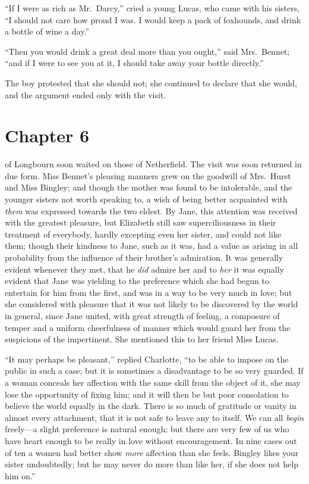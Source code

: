 ``If I were as rich as Mr.\ Darcy,'' cried a young Lucas, who
came with his sisters, ``I should not care how proud I was.  I
would keep a pack of foxhounds, and drink a bottle of wine a
day.''

``Then you would drink a great deal more than you ought,'' said
Mrs.\ Bennet; ``and if I were to see you at it, I should take away
your bottle directly.''

The boy protested that she should not; she continued to declare
that she would, and the argument ended only with the visit.



\chapter{Chapter 6}


 of Longbourn soon waited on those of Netherfield.
The visit was soon returned in due form.  Miss Bennet's
pleasing manners grew on the goodwill of Mrs.\ Hurst and Miss
Bingley; and though the mother was found to be intolerable,
and the younger sisters not worth speaking to, a wish of
being better acquainted with \emph{them} was expressed towards
the two eldest.  By Jane, this attention was received with the
greatest pleasure, but Elizabeth still saw superciliousness in
their treatment of everybody, hardly excepting even her sister,
and could not like them; though their kindness to Jane, such as it
was, had a value as arising in all probability from the influence
of their brother's admiration.  It was generally evident
whenever they met, that he \emph{did} admire her and to \emph{her} it was
equally evident that Jane was yielding to the preference which
she had begun to entertain for him from the first, and was in a
way to be very much in love; but she considered with pleasure
that it was not likely to be discovered by the world in general,
since Jane united, with great strength of feeling, a composure
of temper and a uniform cheerfulness of manner which would
guard her from the suspicions of the impertinent.  She
mentioned this to her friend Miss Lucas.

``It may perhaps be pleasant,'' replied Charlotte, ``to be able to
impose on the public in such a case; but it is sometimes a
disadvantage to be so very guarded.  If a woman conceals her
affection with the same skill from the object of it, she may lose
the opportunity of fixing him; and it will then be but poor
consolation to believe the world equally in the dark.  There is
so much of gratitude or vanity in almost every attachment, that
it is not safe to leave any to itself.  We can all \emph{begin} freely---a
slight preference is natural enough; but there are very few of us
who have heart enough to be really in love without encouragement.
In nine cases out of ten a women had better show \emph{more} affection
than she feels.  Bingley likes your sister undoubtedly; but he
may never do more than like her, if she does not help him on.''

